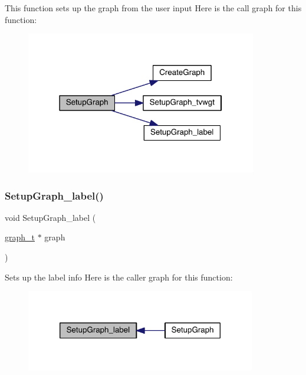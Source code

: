 This function sets up the graph from the user input Here is the call graph for this function\+:\nopagebreak
\begin{figure}[H]
\begin{center}
\leavevmode
\includegraphics[width=286pt]{a00849_a9192cba632de98d1759721a5676eaf05_cgraph}
\end{center}
\end{figure}
\mbox{\label{a00849_a6513355a80c360956e3f38816621ae1e}} 
\subsubsection{\texorpdfstring{Setup\+Graph\+\_\+label()}{SetupGraph\_label()}}
{\footnotesize\ttfamily void Setup\+Graph\+\_\+label (\begin{DoxyParamCaption}\item[{\hyperlink{a00734}{graph\+\_\+t} $\ast$}]{graph }\end{DoxyParamCaption})}

Set\textquotesingle{}s up the label info Here is the caller graph for this function\+:\nopagebreak
\begin{figure}[H]
\begin{center}
\leavevmode
\includegraphics[width=284pt]{a00849_a6513355a80c360956e3f38816621ae1e_icgraph}
\end{center}
\end{figure}
\mbox{\label{a00849_a274db8b39f4bc294fcb5757b01ae31f1}} 
